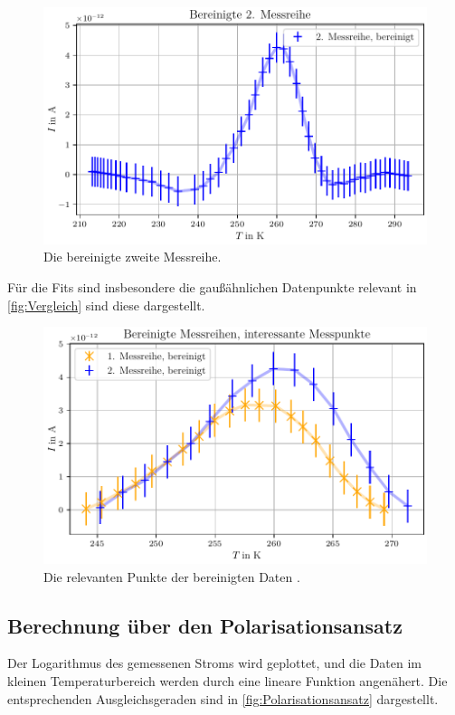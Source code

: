 \begin{figure}[H]
    \centering
    \includegraphics[width=\textwidth]{plots/E_messreihe2_bereinigt.pdf}
    \caption{Die bereinigte zweite Messreihe.}
    \label{fig:Bereinigt2}
\end{figure}

Für die Fits sind insbesondere die gaußähnlichen Datenpunkte relevant in \autoref{fig:Vergleich} sind diese dargestellt.

\begin{figure}[H]
    \centering
    \includegraphics[width=\textwidth]{plots/F_messreihen_bereinigt_relevantepunkte.pdf}
    \caption{Die relevanten Punkte der bereinigten Daten .}
    \label{fig:Vergleich}
\end{figure}

\subsection{Berechnung über den Polarisationsansatz}
Der Logarithmus des gemessenen Stroms wird geplottet, und die Daten im kleinen Temperaturbereich werden
durch eine lineare Funktion angenähert. Die entsprechenden Ausgleichsgeraden sind in \autoref{fig:Polarisationsansatz} dargestellt.

